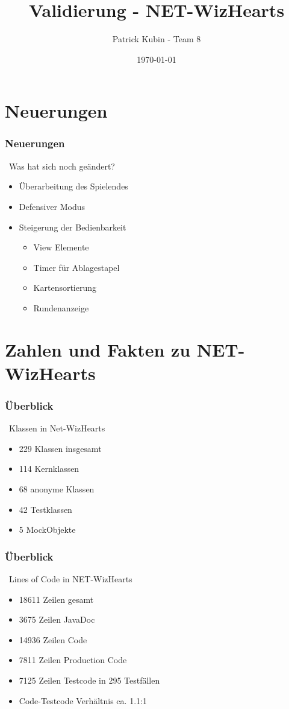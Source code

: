 \documentclass{beamer}
\title{Validierung - NET-WizHearts}
\author{Patrick Kubin - Team 8}
\date{\today}
\begin{document}
\maketitle
{}
 
\section{Neuerungen}
\begin{frame}
 	\frametitle{Neuerungen}
	\ Was hat sich noch geändert?
  	\begin{itemize}
 	 	\item Überarbeitung des Spielendes
		\item Defensiver Modus
  	 	\item Steigerung der Bedienbarkeit
		\begin{itemize}
			\item View Elemente
			\item Timer für Ablagestapel
  	 		\item Kartensortierung
 	 		\item Rundenanzeige
		\end{itemize}
	\end{itemize}
\end{frame}

\section{Zahlen und Fakten zu NET-WizHearts}
\begin{frame}
	\frametitle{Überblick}
	\ Klassen in Net-WizHearts
	\begin{itemize}
		\item 229 Klassen insgesamt
		\item 114 Kernklassen
		\item 68 anonyme Klassen
		\item 42 Testklassen
		\item 5 MockObjekte
	\end{itemize}
\end{frame}

\begin{frame}
  	\frametitle{Überblick}
	\ Lines of Code in NET-WizHearts 
  	\begin{itemize}
		\item 18611 Zeilen gesamt
		\item 3675 Zeilen JavaDoc
		\item 14936 Zeilen Code
		\item 7811 Zeilen Production Code
		\item 7125 Zeilen Testcode in 295 Testfällen
		\item Code-Testcode Verhältnis ca. 1.1:1 
	\end{itemize}	
\end{frame}
\end{document}
